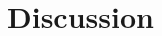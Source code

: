 \doublespacing %

\chapter{Discussion}
\label{ch4}

\begin{spacing}{1} %
\minitoc %
\end{spacing} %
\thesisspacing %



